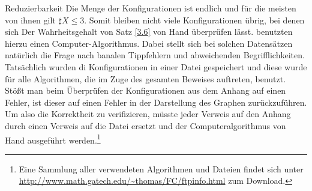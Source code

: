 \begin{section}{Reduzierbarkeit}
 Die Menge der Konfigurationen ist endlich und für die meisten von ihnen gilt $\sharp X \leq 3$. Somit bleiben nicht viele Konfigurationen übrig, bei denen sich Der Wahrheitsgehalt von Satz \ref{3.6} von Hand überprüfen lässt. \rsst benutzten hierzu einen Computer-Algorithmus. Dabei stellt sich bei solchen Datensätzen natürlich die Frage nach banalen Tippfehlern und abweichenden Begrifflichkeiten. Tatsächlich wurden di Konfigurationen in einer Datei gespeichert und diese wurde für alle Algorithmen, die im Zuge des gesamten Beweises auftreten, benutzt. Stößt man beim Überprüfen der Konfigurationen aus dem Anhang auf einen Fehler, ist dieser auf einen Fehler in der Darstellung des Graphen zurückzuführen. Um also die Korrektheit zu verifizieren, müsste jeder Verweis auf den Anhang durch einen Verweis auf die Datei ersetzt und der Computeralgorithmus von Hand ausgeführt werden.\footnote{Eine Sammlung aller verwendeten Algorithmen und Dateien findet sich unter \url{http://www.math.gatech.edu/~thomas/FC/ftpinfo.html} zum Download.}
 

\end{section}
